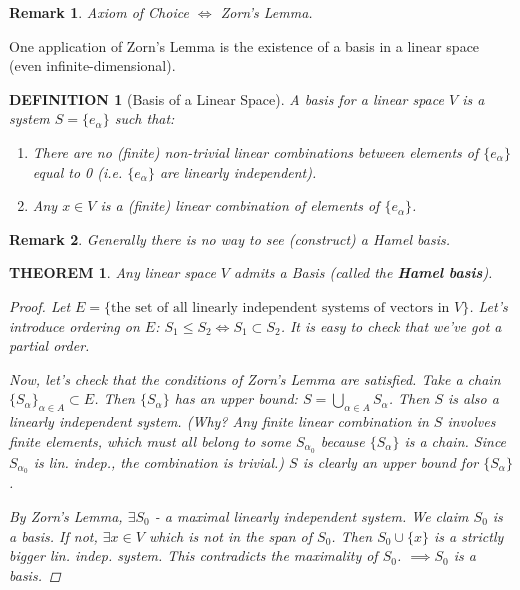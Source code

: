 \documentclass[12pt]{article}
\theoremstyle{blueplain}
\newtheorem{theorem}{THEOREM}[section]
\theoremstyle{bluedef}
\newtheorem{definition}{DEFINITION}[section]
\theoremstyle{blueremark}
\newtheorem{remark}{Remark}[section]
\numberwithin{equation}{section}
\begin{document}
      \begin{remark}
        Axiom of Choice $\iff$ Zorn's Lemma.
      \end{remark}

      One application of Zorn's Lemma is the existence of a basis in a linear space (even infinite-dimensional).

      \begin{definition}[Basis of a Linear Space]
        A basis for a linear space $V$ is a system $S = \{e_\alpha\}$ such that:
        \begin{enumerate}
          \item There are no (finite) non-trivial linear combinations between elements of $\{e_\alpha\}$ equal to 0 (i.e. $\{e_\alpha\}$ are linearly independent).
          \item Any $x \in V$ is a (finite) linear combination of elements of $\{e_\alpha\}$.
        \end{enumerate}
      \end{definition}

      \begin{remark}
        Generally there is no way to see (construct) a Hamel basis.
      \end{remark}

      \begin{theorem}
        Any linear space $V$ admits a Basis (called the \textbf{Hamel basis}).
        \begin{proof}
          Let $E = \{ \text{the set of all linearly independent systems of vectors in } V \}$.
          Let's introduce ordering on $E$:
          $S_1 \leq S_2 \iff S_1 \subset S_2$.
          It is easy to check that we've got a partial order.

          Now, let's check that the conditions of Zorn's Lemma are satisfied.
          Take a chain $\{S_\alpha\}_{\alpha \in A} \subset E$.
          Then $\{S_\alpha\}$ has an upper bound: $S = \bigcup_{\alpha \in A} S_\alpha$.
          Then $S$ is also a linearly independent system.
          (Why? Any finite linear combination in $S$ involves finite elements, which must all belong to some $S_{\alpha_0}$ because $\{S_\alpha\}$ is a chain. Since $S_{\alpha_0}$ is lin. indep., the combination is trivial.)
          $S$ is clearly an upper bound for $\{S_\alpha\}$.

          By Zorn's Lemma, $\exists S_0$ - a maximal linearly independent system.
          We claim $S_0$ is a basis.
          If not, $\exists x \in V$ which is not in the span of $S_0$.
          Then $S_0 \cup \{x\}$ is a strictly bigger lin. indep. system.
          This contradicts the maximality of $S_0$.
          $\implies S_0$ is a basis.
        \end{proof}
      \end{theorem}
\end{document}
